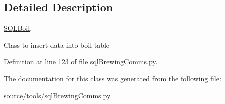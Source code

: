 \subsection{Detailed Description}
\mbox{\hyperlink{classsql_brewing_comms_1_1_s_q_l_boil}{S\+Q\+L\+Boil}}. 

Class to insert data into boil table 

Definition at line 123 of file sql\+Brewing\+Comms.\+py.



The documentation for this class was generated from the following file\+:\begin{DoxyCompactItemize}
\item 
source/tools/sql\+Brewing\+Comms.\+py\end{DoxyCompactItemize}
